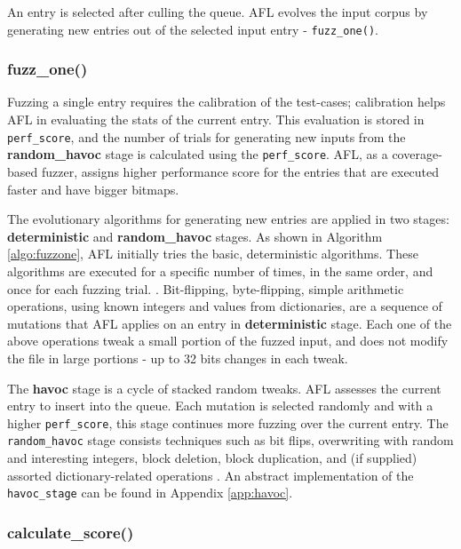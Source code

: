 An entry is selected after culling the queue. AFL evolves the input corpus by generating new entries out of the selected input entry - \texttt{fuzz\_one()}. 

\subsubsection*{fuzz\_one()}



Fuzzing a single entry requires the calibration of the test-cases; calibration helps AFL in evaluating the stats of the current entry. This evaluation is stored in \texttt{perf\_score}, and the number of trials for generating new inputs from the \textbf{random\_havoc} stage is calculated using the \texttt{perf\_score}. AFL, as a coverage-based fuzzer, assigns higher performance score for the entries that are executed faster and have bigger bitmaps.

The evolutionary algorithms for generating new entries are applied in two stages: \textbf{deterministic} and \textbf{random\_havoc} stages. As shown in Algorithm \ref{algo:fuzzone}, AFL initially tries the basic, deterministic algorithms. These algorithms are executed for a specific number of times, in the same order, and once for each fuzzing trial. . Bit-flipping, byte-flipping, simple arithmetic operations, using known integers and values from dictionaries, are a sequence of mutations that AFL applies on an entry in \textbf{deterministic} stage. Each one of the above operations tweak a small portion of the fuzzed input, and does not modify the file in large portions - up to 32 bits changes in each tweak.

The \textbf{havoc} stage is a cycle of stacked random tweaks. AFL assesses the current entry to insert into the queue. Each mutation is selected randomly and with a higher \texttt{perf\_score}, this stage continues more fuzzing over the current entry. The \texttt{random\_havoc} stage consists techniques such as bit flips, overwriting with random and interesting integers, block deletion, block duplication, and (if supplied) assorted dictionary-related operations \cite{afl_userguide}. An abstract implementation of the \texttt{havoc\_stage} can be found in Appendix \ref{app:havoc}.

\subsubsection*{calculate\_score()}
\label{sub:calc_score}

